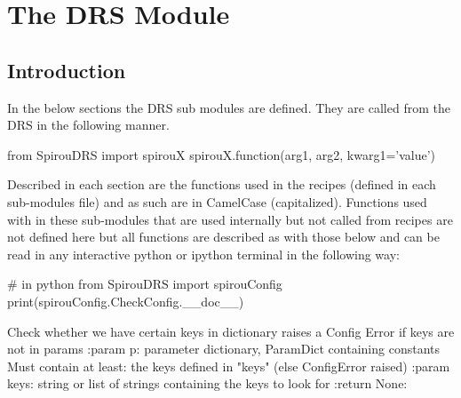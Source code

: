 \chapter{The DRS Module}
\label{ch:the_module}

\section{Introduction}
\label{ch:the_module:intro}

In the below sections the DRS sub modules are defined. They are called from the DRS in the following manner.

\begin{pythonbox}
from SpirouDRS import spirouX
spirouX.function(arg1, arg2, kwarg1='value')
\end{pythonbox}

\noindent Described in each section are the functions used in the recipes (defined in each sub-modules  file) and as such are in CamelCase (capitalized). Functions used with in these sub-modules that are used internally but not called from recipes are not defined here but all functions are described as with those below and can be read in any interactive python or ipython terminal in the following way:

\begin{minipage}{\textwidth}
\begin{pythonbox}
# in python
from SpirouDRS import spirouConfig
print(spirouConfig.CheckConfig.__doc__)
\end{pythonbox}
\vspace{-0.25cm}
\begin{cmdboxprint}
Check whether we have certain keys in dictionary
raises a Config Error if keys are not in params
:param p: parameter dictionary, ParamDict containing constants
    Must contain at least:
        the keys defined in "keys" (else ConfigError raised)
:param keys: string or list of strings containing the keys to look for
:return None:
\end{cmdboxprint}
\end{minipage}

\vspace{0.5cm}

